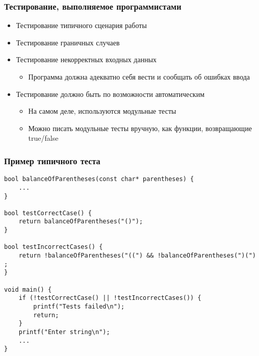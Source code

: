 \documentclass[xetex,mathserif,serif]{beamer}
\begin{document}
    \begin{frame}
        \frametitle{Тестирование, выполняемое программистами}
        \begin{itemize}
            \item Тестирование типичного сценария работы
            \item Тестирование граничных случаев
            \item Тестирование некорректных входных данных
            \begin{itemize}
                \item Программа должна адекватно себя вести и сообщать об ошибках ввода
            \end{itemize}
            \item Тестирование должно быть по возможности автоматическим
            \begin{itemize}
                \item На самом деле, используются модульные тесты
                \item Можно писать модульные тесты вручную, как функции, возвращающие true/false
            \end{itemize}
        \end{itemize}
    \end{frame}
    
    \begin{frame}[fragile]
        \frametitle{Пример типичного теста}
        \begin{footnotesize}
            \begin{verbatim}
bool balanceOfParentheses(const char* parentheses) {
    ...
}

bool testCorrectCase() {
    return balanceOfParentheses("()");
}

bool testIncorrectCases() {
    return !balanceOfParentheses("((") && !balanceOfParentheses(")(") ;
}

void main() {
    if (!testCorrectCase() || !testIncorrectCases()) {
        printf("Tests failed\n");
        return;
    }
    printf("Enter string\n");
    ...
}
            \end{verbatim}
        \end{footnotesize}
    \end{frame}
\end{document}
